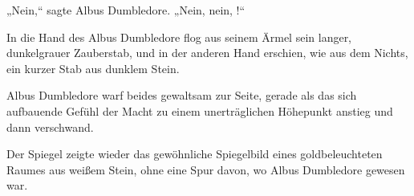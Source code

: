 „Nein,“ sagte Albus Dumbledore. „Nein, nein, !“

In die Hand des Albus Dumbledore flog aus seinem Ärmel sein langer, dunkelgrauer Zauberstab, und in der anderen Hand erschien, wie aus dem Nichts, ein kurzer Stab aus dunklem Stein.

Albus Dumbledore warf beides gewaltsam zur Seite, gerade als das sich aufbauende Gefühl der Macht zu einem unerträglichen Höhepunkt anstieg und dann verschwand.

Der Spiegel zeigte wieder das gewöhnliche Spiegelbild eines goldbeleuchteten Raumes aus weißem Stein, ohne eine Spur davon, wo Albus Dumbledore gewesen war.

